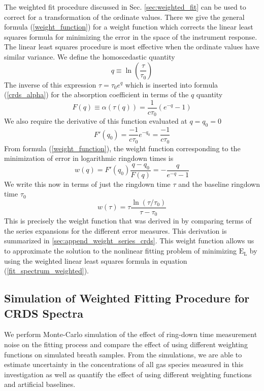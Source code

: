 \documentclass[8pt,a4paper]{report}
\begin{document}
	The weighted fit procedure discussed in Sec. \ref{sec:weighted_fit} can be used to correct for a transformation of the ordinate values. There we give the general formula (\ref{weight_function}) for a weight function which corrects the linear least squares formula for minimizing the error in the space of the instrument response. The linear least squares procedure is most effective when the ordinate values have similar variance. We define the homoscedastic quantity
	\begin{equation}
		q \equiv \ln \left(\frac{\tau}{\tau_0}\right)
	\end{equation}
	The inverse of this expression $\tau = \tau_0 e^q$ which is inserted into formula (\ref{crds_alpha}) for the absorption coefficient in terms of the $q$ quantity
	\begin{equation}
		F(q) \equiv \alpha(\tau(q)) = \frac{1}{c\tau_0}\left(e^{-q} - 1\right)
	\end{equation}
	We also require the derivative of this function evaluated at $q = q_0 = 0$
	\begin{equation}
		F'(q_0) = \frac{-1}{c\tau_0}e^{-q_0} = \frac{-1}{c\tau_0}
	\end{equation}
	From formula (\ref{weight_function}), the weight function corresponding to the minimization of error in logarithmic ringdown times is
	\begin{equation}
		w(q) = F'(q_0)\frac{q - q_0}{F(q)} = -\frac{q}{e^{-q} - 1}
	\end{equation}
	We write this now in terms of just the ringdown time $\tau$ and the baseline ringdown time $\tau_0$
	\begin{equation}
		w(\tau) = \tau \frac{\ln\left(\tau/\tau_0\right)}{\tau - \tau_0}
	\end{equation}
	This is precisely the weight function that was derived in \cite{mine_acetone} by comparing terms of the series expansions for the different error measures. This derivation is summarized in \ref{sec:append_weight_series_crds}. This weight function allows us to approximate the solution to the nonlinear fitting problem of minimizing $\mathrm{E}_\mathrm{L}$ by using the weighted linear least squares formula in equation (\ref{fit_spectrum_weighted}).
	
	\subsection{Simulation of Weighted Fitting Procedure for CRDS Spectra} \label{sec:simulation}
	We perform Monte-Carlo simulation of the effect of ring-down time measurement noise on the fitting process and compare the effect of using different weighting functions on simulated breath samples. From the simulations, we are able to estimate uncertainty in the concentrations of all gas species measured in this investigation as well as quantify the effect of using different weighting functions and artificial baselines.
	
\end{document}
